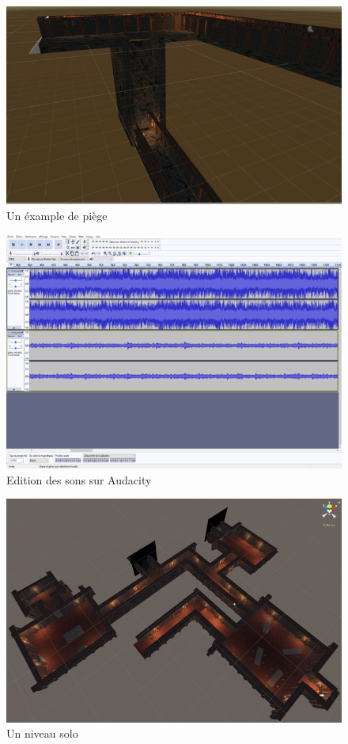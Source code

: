 \documentclass[titlepage, 13px, a4paper]{report}
\begin{document}
\begin{figure}[h!]
  \centering
  \includegraphics[width=13cm]{images/annexe_trap.png}
  \caption{Un éxample de piège}
\end{figure}

\begin{figure}[h!]
  \centering
  \includegraphics[width=13cm]{images/annexe_audacity.png}
  \caption{Edition des sons sur Audacity}
\end{figure}

\begin{figure}[h!]
  \centering
  \includegraphics[width=13cm]{images/annexe_level.png}
  \caption{Un niveau solo}
\end{figure}
\end{document}
